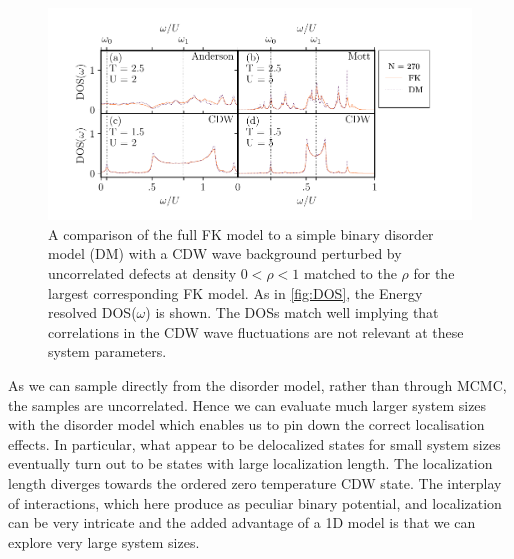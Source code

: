 \hypertarget{fig:DM_DOS}{%
\begin{figure}
\centering
\includegraphics[width=1\textwidth,height=\textheight]{figure_code/fk_chapter/disorder_model/DM_DOS}
\caption[{FK model compared to binary disorder model: DOS}]{A comparison of the full FK model to a simple binary disorder model (DM) with a CDW wave background perturbed by uncorrelated defects at density \(0 < \rho < 1\) matched to the \(\rho\) for the largest corresponding FK model. As in \cref{fig:DOS}, the Energy resolved DOS(\(\omega\)) is shown. The DOSs match well implying that correlations in the CDW wave fluctuations are not relevant at these system parameters.}
\label{fig:DM_DOS}
\end{figure}
}

As we can sample directly from the disorder model, rather than through MCMC, the samples are uncorrelated. Hence we can evaluate much larger system sizes with the disorder model which enables us to pin down the correct localisation effects. In particular, what appear to be delocalized states for small system sizes eventually turn out to be states with large localization length. The localization length diverges towards the ordered zero temperature CDW state. The interplay of interactions, which here produce as peculiar binary potential, and localization can be very intricate and the added advantage of a 1D model is that we can explore very large system sizes.

